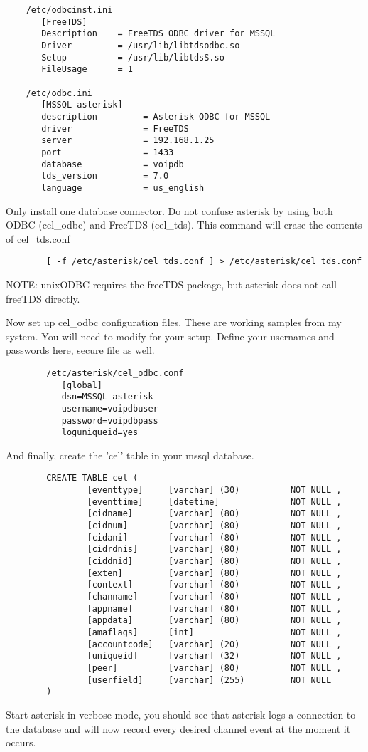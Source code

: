 \begin{verbatim}
	/etc/odbcinst.ini
	   [FreeTDS]
	   Description    = FreeTDS ODBC driver for MSSQL
	   Driver         = /usr/lib/libtdsodbc.so
	   Setup          = /usr/lib/libtdsS.so
	   FileUsage      = 1

	/etc/odbc.ini
	   [MSSQL-asterisk]
	   description         = Asterisk ODBC for MSSQL
	   driver              = FreeTDS
	   server              = 192.168.1.25
	   port                = 1433
	   database            = voipdb
	   tds_version         = 7.0
	   language            = us_english
\end{verbatim}

		Only install one database connector.  Do not confuse asterisk
		by using both ODBC (cel_odbc) and FreeTDS (cel_tds).
		This command will erase the contents of cel_tds.conf 
\begin{verbatim}
		[ -f /etc/asterisk/cel_tds.conf ] > /etc/asterisk/cel_tds.conf
\end{verbatim}
		NOTE:  unixODBC requires the freeTDS package, but asterisk does
		not call freeTDS directly.

		Now set up cel_odbc configuration files.  These are working samples
		from my system.  You will need to modify for your setup. Define
		your usernames and passwords here, secure file as well.
\begin{verbatim}
		/etc/asterisk/cel_odbc.conf
		   [global]
		   dsn=MSSQL-asterisk
		   username=voipdbuser
		   password=voipdbpass
		   loguniqueid=yes
\end{verbatim}
		And finally, create the 'cel' table in your mssql database.
\begin{verbatim}
		CREATE TABLE cel (
				[eventtype]     [varchar] (30)          NOT NULL ,
		        [eventtime]     [datetime]              NOT NULL ,
		        [cidname]       [varchar] (80)          NOT NULL ,
		        [cidnum]        [varchar] (80)          NOT NULL ,
		        [cidani]        [varchar] (80)          NOT NULL ,
		        [cidrdnis]      [varchar] (80)          NOT NULL ,
		        [ciddnid]       [varchar] (80)          NOT NULL ,
		        [exten]         [varchar] (80)          NOT NULL ,
		        [context]       [varchar] (80)          NOT NULL ,
		        [channame]      [varchar] (80)          NOT NULL ,
		        [appname]       [varchar] (80)          NOT NULL ,
		        [appdata]       [varchar] (80)          NOT NULL ,
		        [amaflags]      [int]                   NOT NULL ,
		        [accountcode]   [varchar] (20)          NOT NULL ,
		        [uniqueid]      [varchar] (32)          NOT NULL ,
		        [peer]          [varchar] (80)          NOT NULL ,
		        [userfield]     [varchar] (255)         NOT NULL
		)
\end{verbatim}
		Start asterisk in verbose mode, you should see that asterisk
		logs a connection to the database and will now record every
		desired channel event at the moment it occurs.

